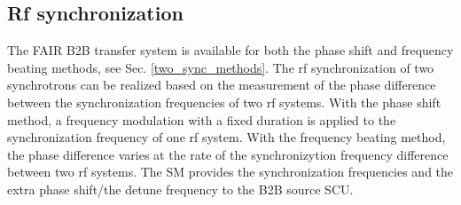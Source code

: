 \subsection{Rf synchronization}
The FAIR B2B transfer system is available for both the phase shift and frequency beating methods, see Sec. \ref{two_sync_methods}. The rf synchronization of two synchrotrons can be realized based on the measurement of the phase difference between the synchronization frequencies of two rf systems. With the phase shift method, a frequency modulation with a fixed duration is applied to the synchronization frequency of one rf system. With the frequency beating method, the phase difference varies at the rate of the synchronizytion frequency difference between two rf systems. The SM provides the synchronization frequencies and the extra phase shift/the detune frequency to the B2B source SCU.
